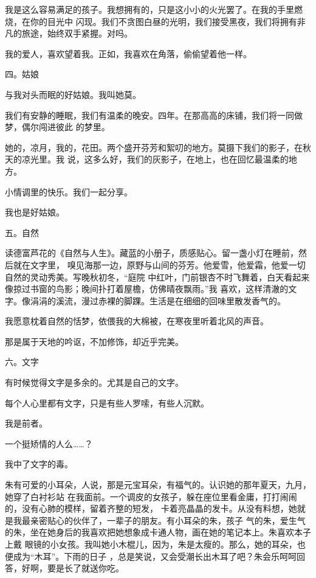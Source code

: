 \documentclass[12pt,a4paper]{article}
\newcommand{\subpart}[1]{
	\begingroup \par
	\vspace{1ex} \centering #1
	\par \endgroup \nopagebreak[4]
}
\begin{document}
		我是这么容易满足的孩子。我想拥有的，只是这小小的火光罢了。在我的手里燃烧，在你的目光中
	闪现。我们不贪图白昼的光明，我们接受黑夜，我们将拥有非凡的旅途，始终双手紧握。对吗。

		我的爱人，喜欢望着我。正如，我喜欢在角落，偷偷望着他一样。

		\subpart{四。姑娘}

		与我对头而眠的好姑娘。我叫她莫。

		我们有安静的睡眠，我们有温柔的晚安。四年。在那高高的床铺，我们将一同做梦，偶尔闯进彼此
	的梦里。

		她的，凉月，我的，花田。两个盛开芬芳和絮叨的地方。莫摄下我们的影子，在秋天的凉光里。我
	说，这多么好，我们的灰影子，在地上，也在回忆最温柔的地方。

		小情调里的快乐。我们一起分享。

		我也是好姑娘。

		\subpart{五。自然}

		读德富芦花的《自然与人生》。藏蓝的小册子，质感贴心。留一盏小灯在睡前，然后就在文字里，
	嗅见海那一边，原野与山间的芬芳。他爱雪，他爱霜，他爱一切自然的灵动秀美。写晚秋初冬，“庭院
	中红叶，门前银杏不时飞舞着，白天看起来像掠过书窗的鸟影；晚间扑打着屋檐，仿佛晴夜飘雨。”我
	喜欢，这样清澈的文字。像涓涓的溪流，漫过赤裸的脚踝。生活是在细细的回味里散发香气的。

		我愿意枕着自然的恬梦，依偎我的大棉被，在寒夜里听着北风的声音。

		那是属于天地的吟讴，不加修饰，却近乎完美。

		\subpart{六。文字}

		有时候觉得文字是多余的。尤其是自己的文字。

		每个人心里都有文字，只是有些人罗嗦，有些人沉默。

		我是前者。

		一个挺矫情的人么……？

		我中了文字的毒。

	\endwriting



		朱有可爱的小耳朵，人说，那是元宝耳朵，有福气的。认识她的那年夏天，九月，她穿了白衬衫站
	在我面前。一个调皮的女孩子，躲在座位里看金庸，打打闹闹的，没有心肺的模样，留着齐整的短发，
	卡着亮晶晶的发卡。从没有料想，她就是我最亲密贴心的伙伴了，一辈子的朋友。有小耳朵的朱，孩子
	气的朱，爱生气的朱，坐在她身后的我喜欢把她想象成卡通人物，画在她的笔记本上。朱喜欢本子上戴
	眼镜的小女孩。我叫她小木棍儿，因为，朱是太瘦的。那么，她的耳朵，也便成为“木耳”。下雨的日子
	，总是笑说，又会受潮长出木耳了吧？朱会乐呵呵回答，好啊，要是长了就送你吃。
\end{document}
